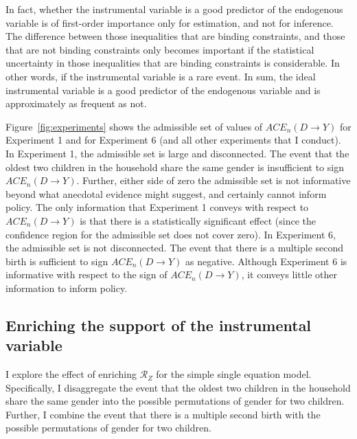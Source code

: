 \documentclass[10pt,a4paper,twoside]{article}
\numberwithin{equation}{section}
\begin{document}
In fact, whether the instrumental variable is a good predictor of the endogenous variable is of first-order importance only for estimation, and not for inference. The difference between those inequalities that are binding constraints, and those that are not binding constraints only becomes important if the statistical uncertainty in those inequalities that are binding constraints is considerable. In other words, if the instrumental variable is a rare event. In sum, the ideal instrumental variable is a good predictor of the endogenous variable and is approximately as frequent as not.  

Figure~\ref{fig:experiments} shows the admissible set of values of $ACE_n(D\rightarrow Y)$ for Experiment 1 and for Experiment 6 (and all other experiments that I conduct). In Experiment 1, the admissible set is large and disconnected. The event that the oldest two children in the household share the same gender is insufficient to sign $ACE_n(D\rightarrow Y)$. Further, either side of zero the admissible set is not informative beyond what anecdotal evidence might suggest, and certainly cannot inform policy. The only information that Experiment 1 conveys with respect to $ACE_n(D\rightarrow Y)$ is that there is a statistically significant effect (since the confidence region for the admissible set does not cover zero). In Experiment 6, the admissible set is not disconnected. The event that there is a multiple second birth is sufficient to sign $ACE_n(D\rightarrow Y)$ as negative. Although Experiment 6 is informative with respect to the sign of $ACE_n(D\rightarrow Y)$, it conveys little other information to inform policy.  
\subsection{Enriching the support of the instrumental variable}
I explore the effect of enriching $\mathcal{R}_Z$ for the simple single equation model. Specifically, I disaggregate the event that the oldest two children in the household share the same gender into the possible permutations of gender for two children. Further, I combine the event that there is a multiple second birth with the possible permutations of gender for two children.
\end{document}
